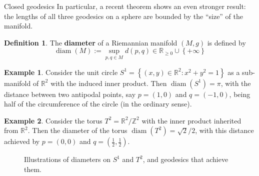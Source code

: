 \documentclass{article}
\newcommand{\set}[1]{\left\{#1\right\}}
\theoremstyle{definition}
\newtheorem{definition}{Definition}[section]
\newtheorem{example}{Example}[section]
\theoremstyle{remark}
\begin{document}
\begin{section}{Closed geodesics}
  In particular, a recent theorem shows an even stronger result: the
  lengths of all three geodesics on a sphere are bounded by the ``size'' of
  the manifold.
  \begin{definition} %
    The \textbf{diameter} of a Riemannian manifold $(M, g)$ is defined by \[
      \operatorname{diam}(M) := \sup_{p, q\in M} d(p, q) \in \mathbb R_{\geq 0} \cup \set{+\infty}
    \]
  \end{definition}
  \begin{example} %
    Consider the unit circle $S^1 = \set{(x, y) \in \mathbb R^2 : x^2 + y^2 = 1}$
    as a sub-manifold of $\mathbb R^2$ with the induced inner product.
    Then $\operatorname{diam}(S^1) = \pi$, with the distance between two antipodal
    points, say $p = (1, 0)$ and $q = (-1, 0)$, being half of the circumference
    of the circle (in the ordinary sense).
  \end{example}
  \begin{example} %
    Consider the torus $T^2 = \mathbb R^2/\mathbb Z^2$ with the inner product
    inherited from $\mathbb R^2$. Then the diameter of the torus
    $\operatorname{diam}(T^2) = \sqrt{2}/2$, with this distance achieved by
    $p = (0, 0)$ and $q = (\frac 12, \frac 12)$.
  \end{example}
  \begin{figure}[ht]
    
    \caption{Illustrations of diameters on $S^1$ and $T^2$, and geodesics
    that achieve them.}
  \end{figure}


\end{section}
\end{document}
